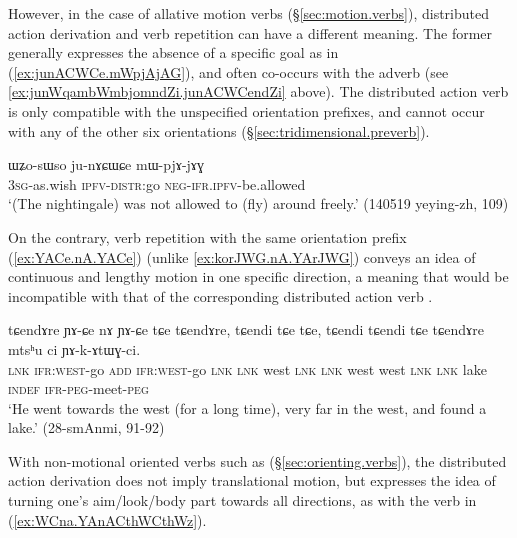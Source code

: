 However, in the case of allative motion verbs (§\ref{sec:motion.verbs}), distributed action derivation and verb repetition can have a different meaning. The former generally expresses the absence of a specific goal as in (\ref{ex:junACWCe.mWpjAjAG}), and often co-occurs with the adverb  (see \ref{ex:junWqambWmbjomndZi.junACWCendZi} above). The distributed action verb  is only compatible with the unspecified orientation prefixes, and cannot occur with any of the other six orientations (§\ref{sec:tridimensional.preverb}).

\begin{exe}
\ex \label{ex:junACWCe.mWpjAjAG}
\gll ɯʑo-sɯso ju-nɤɕɯɕe mɯ-pjɤ-jɤɣ \\
\textsc{3sg}-as.wish \textsc{ipfv}-\textsc{distr}:go \textsc{neg}-\textsc{ifr}.\textsc{ipfv}-be.allowed \\
\glt `(The nightingale) was not allowed to (fly) around freely.' (140519 yeying-zh, 109)
\end{exe}


On the contrary, verb repetition with the same orientation prefix (\ref{ex:YACe.nA.YACe}) (unlike \ref{ex:korJWG.nA.YArJWG}) conveys an idea of continuous and lengthy motion in one specific direction, a meaning that would be incompatible with that of the corresponding distributed action verb .

\begin{exe}
\ex \label{ex:YACe.nA.YACe}
\gll tɕendɤre ɲɤ-ɕe nɤ ɲɤ-ɕe tɕe tɕendɤre, tɕendi tɕe tɕe, tɕendi tɕendi tɕe tɕendɤre mtsʰu ci ɲɤ-k-ɤtɯɣ-ci. \\
\textsc{lnk} \textsc{ifr}:\textsc{west}-go \textsc{add} \textsc{ifr}:\textsc{west}-go \textsc{lnk} \textsc{lnk} west \textsc{lnk} \textsc{lnk} west west \textsc{lnk} \textsc{lnk} lake \textsc{indef} \textsc{ifr}-\textsc{peg}-meet-\textsc{peg} \\
\glt `He went towards the west (for a long time), very far in the west, and found a lake.' (28-smAnmi, 91-92)
\end{exe}

With non-motional oriented verbs such as  (§\ref{sec:orienting.verbs}), the distributed action derivation does not imply translational motion, but expresses the idea of turning one's aim/look/body part towards all directions, as with the verb  in (\ref{ex:WCna.YAnACthWCthWz}).


